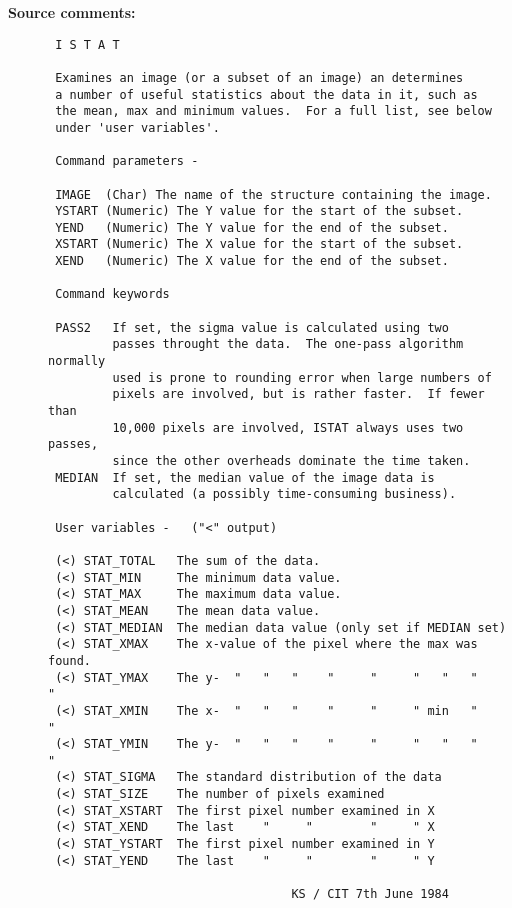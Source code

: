 \begin{description}
\item [{\bf Source comments:}]
\begin{verbatim}
 I S T A T

 Examines an image (or a subset of an image) an determines
 a number of useful statistics about the data in it, such as
 the mean, max and minimum values.  For a full list, see below
 under 'user variables'.

 Command parameters -

 IMAGE  (Char) The name of the structure containing the image.
 YSTART (Numeric) The Y value for the start of the subset.
 YEND   (Numeric) The Y value for the end of the subset.
 XSTART (Numeric) The X value for the start of the subset.
 XEND   (Numeric) The X value for the end of the subset.

 Command keywords

 PASS2   If set, the sigma value is calculated using two
         passes throught the data.  The one-pass algorithm normally
         used is prone to rounding error when large numbers of
         pixels are involved, but is rather faster.  If fewer than
         10,000 pixels are involved, ISTAT always uses two passes,
         since the other overheads dominate the time taken.
 MEDIAN  If set, the median value of the image data is
         calculated (a possibly time-consuming business).

 User variables -   ("<" output)

 (<) STAT_TOTAL   The sum of the data.
 (<) STAT_MIN     The minimum data value.
 (<) STAT_MAX     The maximum data value.
 (<) STAT_MEAN    The mean data value.
 (<) STAT_MEDIAN  The median data value (only set if MEDIAN set)
 (<) STAT_XMAX    The x-value of the pixel where the max was found.
 (<) STAT_YMAX    The y-  "   "   "    "     "     "   "   "    "
 (<) STAT_XMIN    The x-  "   "   "    "     "     " min   "    "
 (<) STAT_YMIN    The y-  "   "   "    "     "     "   "   "    "
 (<) STAT_SIGMA   The standard distribution of the data
 (<) STAT_SIZE    The number of pixels examined
 (<) STAT_XSTART  The first pixel number examined in X
 (<) STAT_XEND    The last    "     "        "     " X
 (<) STAT_YSTART  The first pixel number examined in Y
 (<) STAT_YEND    The last    "     "        "     " Y

                                  KS / CIT 7th June 1984
\end{verbatim}
\end{description}
